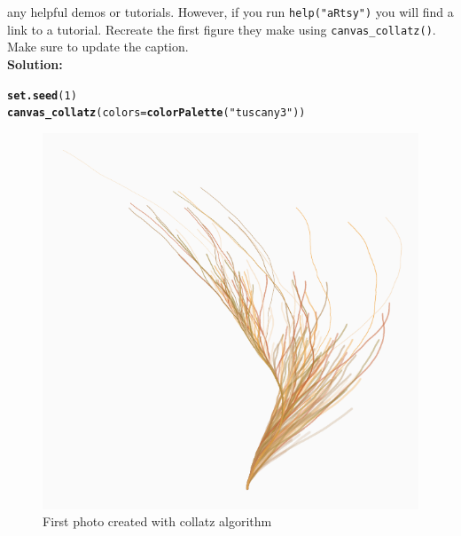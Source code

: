\documentclass{article}\usepackage[]{graphicx}\usepackage[]{xcolor}
\makeatletter
\def\maxwidth{ %
  \ifdim\Gin@nat@width>\linewidth
    \linewidth
  \else
    \Gin@nat@width
  \fi
}
\newcommand{\hlnum}[1]{\textcolor[rgb]{0.686,0.059,0.569}{#1}}%
\newcommand{\hlsng}[1]{\textcolor[rgb]{0.192,0.494,0.8}{#1}}%
\newcommand{\hldef}[1]{\textcolor[rgb]{0.345,0.345,0.345}{#1}}%
\newcommand{\hlkwc}[1]{\textcolor[rgb]{0.333,0.667,0.333}{#1}}%
\newcommand{\hlkwd}[1]{\textcolor[rgb]{0.737,0.353,0.396}{\textbf{#1}}}%
\newenvironment{kframe}{%
 \def\at@end@of@kframe{}%
 \ifinner\ifhmode%
  \def\at@end@of@kframe{\end{minipage}}%
  \begin{minipage}{\columnwidth}%
 \fi\fi%
 \def\FrameCommand##1{\hskip\@totalleftmargin \hskip-\fboxsep
 \colorbox{shadecolor}{##1}\hskip-\fboxsep
     \hskip-\linewidth \hskip-\@totalleftmargin \hskip\columnwidth}%
 \MakeFramed {\advance\hsize-\width
   \@totalleftmargin\z@ \linewidth\hsize
   \@setminipage}}%
 {\par\unskip\endMakeFramed%
 \at@end@of@kframe}
\newenvironment{knitrout}{}{} %
\makeatother
\begin{document}
\begin{enumerate}
\begin{enumerate}
 any helpful demos or tutorials. However, if you run \texttt{help("aRtsy")} you 
 will find a link to a tutorial. Recreate the first figure they make using 
 \texttt{canvas\_collatz()}. Make sure to update the caption.\\
\textbf{Solution:}
\begin{knitrout}\scriptsize
{}\color{fgcolor}\begin{kframe}
\begin{alltt}
\hlkwd{set.seed}\hldef{(}\hlnum{1}\hldef{)}
\hlkwd{canvas_collatz}\hldef{(}\hlkwc{colors} \hldef{=} \hlkwd{colorPalette}\hldef{(}\hlsng{"tuscany3"}\hldef{))}
\end{alltt}
\end{kframe}
\end{knitrout}
\begin{figure}[H]
\begin{center}
\begin{knitrout}
\color{fgcolor}
\includegraphics[width=\maxwidth]{figure/unnamed-chunk-3-1} 
\end{knitrout}
\caption{First photo created with collatz algorithm}
\label{CollatzPlot1}
\end{center}
\end{figure}

\end{enumerate}
\end{enumerate}
\end{document}
